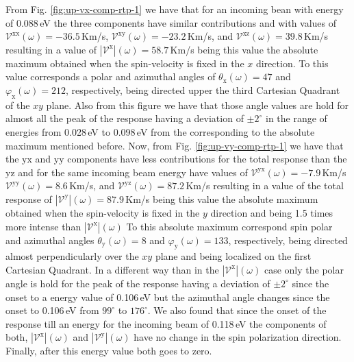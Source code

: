 \documentclass[prb,11pt,tightenlines,twocolumn,aps]{revtex4-1}
\begin{document}
From Fig. \ref{fig:up-vx-comp-rtp-1} we have that for an incoming bean with
energy of 0.088\,eV the three components have similar contributions and with
values of 
% 
$\mathcal{V}^{\mathrm{xx}}(\omega)=-36.5$\,Km/s,
$\mathcal{V}^{\mathrm{xy}}(\omega)=-23.2$\,Km/s, and
$\mathcal{V}^{\mathrm{xz}}(\omega)= 39.8$\,Km/s 
% 
resulting in a value of
% 
$|\mathcal{V}^{\mathrm{x}}|(\omega)=58.7$\,Km/s 
% 
being this value the absolute maximum obtained when the spin-velocity is fixed
in the $x$ direction. To this value corresponds a polar and azimuthal angles of
$\theta_{\mathrm{x}}(\omega)=47$ and $\varphi_{\mathrm{x}}(\omega)=212$,
respectively, being directed upper the third Cartesian Quadrant of the $xy$
plane. Also from this figure we have that those angle values are hold for almost
all the peak of the response having a deviation of $\pm 2^{\circ}$ in the range
of energies from 0.028\,eV to 0.098\,eV from the corresponding to the absolute
maximum mentioned before.
% 
Now, from Fig. \ref{fig:up-vy-comp-rtp-1} we have that the $\mathrm{yx}$ and
$\mathrm{yy}$ components have less contributions for the total response than the
$\mathrm{yz}$ and for the same incoming beam energy have values of
% 
$\mathcal{V}^{\mathrm{yx}}(\omega)= -7.9$\,Km/s 
$\mathcal{V}^{\mathrm{yy}}(\omega)=  8.6$\,Km/s, and
$\mathcal{V}^{\mathrm{yz}}(\omega)= 87.2$\,Km/s 
% 
resulting in a value of the total response of
% 
$|\mathcal{V}^{\mathrm{y}}|(\omega)=87.9$\,Km/s
% 
being this value the absolute maximum obtained when the spin-velocity is fixed
in the $y$ direction and being 1.5 times more intense than
$|\mathcal{V}^{\mathrm{x}}|(\omega)$ To this absolute maximum correspond spin
polar and azimuthal angles $\theta_{\mathrm{y}}(\omega)=8$ and
$\varphi_{\mathrm{y}}(\omega)=133$, respectively, being directed almost
perpendicularly over the $xy$ plane and being localized on the first Cartesian
Quadrant. In a different way than in the $|\mathcal{V}^{\mathrm{x}}|(\omega)$
case only the polar angle is hold for the peak of the response having a
deviation of $\pm 2^{\circ}$ since the onset to a energy value of 0.106\,eV but
the azimuthal angle changes since the onset to 0.106\,eV from $99^{\circ}$ to
$176^{\circ}$.
% 
We also found that since the onset of the response till an
energy for the incoming beam of 0.118\,eV the components of both,
$|\mathcal{V}^{\mathrm{x}}|(\omega)$ and $|\mathcal{V}^{\mathrm{y}}|(\omega)$
have no change in the spin polarization direction. Finally, after this energy
value both goes to zero.
\end{document}
